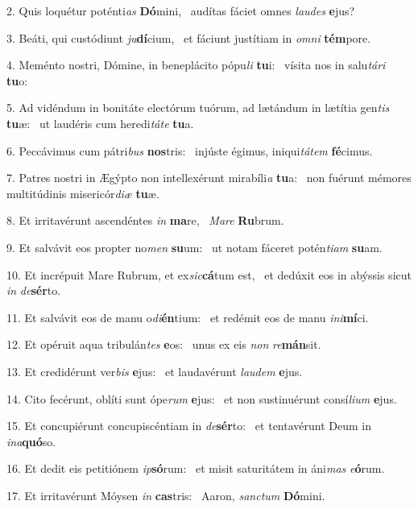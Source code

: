 2. Quis loquétur poténti\textit{as} \textbf{Dó}mini, \ast\  audítas fáciet omnes \textit{lau}\textit{des} \textbf{e}jus?\

3. Beáti, qui custódiunt \textit{ju}\textbf{dí}cium, \ast\  et fáciunt justítiam in \textit{om}\textit{ni} \textbf{tém}pore.\

4. Meménto nostri, Dómine, in beneplácito pópu\textit{li} \textbf{tu}i: \ast\  vísita nos in salu\textit{tá}\textit{ri} \textbf{tu}o:\

5. Ad vidéndum in bonitáte electórum tuórum, ad lætándum in lætítia gen\textit{tis} \textbf{tu}æ: \ast\  ut laudéris cum heredi\textit{tá}\textit{te} \textbf{tu}a.\

6. Peccávimus cum pátri\textit{bus} \textbf{nos}tris: \ast\  injúste égimus, iniqui\textit{tá}\textit{tem} \textbf{fé}cimus.\

7. Patres nostri in Ægýpto non intellexérunt mirabíli\textit{a} \textbf{tu}a: \ast\  non fuérunt mémores multitúdinis misericór\textit{di}\textit{æ} \textbf{tu}æ.\

8. Et irritavérunt ascendéntes \textit{in} \textbf{ma}re, \ast\  \textit{Ma}\textit{re} \textbf{Ru}brum.\

9. Et salvávit eos propter no\textit{men} \textbf{su}um: \ast\  ut notam fáceret potén\textit{ti}\textit{am} \textbf{su}am.\

10. Et incrépuit Mare Rubrum, et ex\textit{sic}\textbf{cá}tum est, \ast\  et dedúxit eos in abýssis sicut \textit{in} \textit{de}\textbf{sér}to.\

11. Et salvávit eos de manu o\textit{di}\textbf{én}tium: \ast\  et redémit eos de manu \textit{in}\textit{i}\textbf{mí}ci.\

12. Et opéruit aqua tribulán\textit{tes} \textbf{e}os: \ast\  unus ex eis \textit{non} \textit{re}\textbf{mán}sit.\

13. Et credidérunt ver\textit{bis} \textbf{e}jus: \ast\  et laudavérunt \textit{lau}\textit{dem} \textbf{e}jus.\

14. Cito fecérunt, oblíti sunt ópe\textit{rum} \textbf{e}jus: \ast\  et non sustinuérunt consí\textit{li}\textit{um} \textbf{e}jus.\

15. Et concupiérunt concupiscéntiam in \textit{de}\textbf{sér}to: \ast\  et tentavérunt Deum in \textit{in}\textit{a}\textbf{quó}so.\

16. Et dedit eis petitiónem \textit{ip}\textbf{só}rum: \ast\  et misit saturitátem in áni\textit{mas} \textit{e}\textbf{ó}rum.\

17. Et irritavérunt Móysen \textit{in} \textbf{cas}tris: \ast\  Aaron, \textit{sanc}\textit{tum} \textbf{Dó}mini.\

